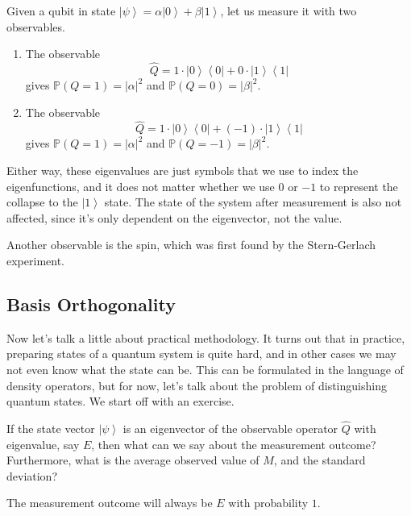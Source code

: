 \documentclass{article}
\newcommand{\ket}[1]{\ensuremath{\left|#1\right\rangle}}
\newcommand{\bra}[1]{\ensuremath{\left\langle#1\right|}}
\begin{document}
    \begin{example}
      \label{ex:position-measurement-of-qubit}
      Given a qubit in state $\ket{\psi} = \alpha \ket{0} + \beta \ket{1}$, let us measure it with two observables. 
      \begin{enumerate} 
        \item The observable 
          \begin{equation} 
            \hat{Q} = 1 \cdot \ket{0}\bra{0} + 0 \cdot \ket{1}\bra{1}
          \end{equation}
          gives $\mathbb{P}(Q = 1) = |\alpha|^2$ and $\mathbb{P}(Q = 0) = |\beta|^2$. 

        \item The observable 
          \begin{equation} 
            \hat{Q} = 1 \cdot \ket{0}\bra{0} + (-1) \cdot \ket{1}\bra{1}
          \end{equation}
          gives $\mathbb{P}(Q = 1) = |\alpha|^2$ and $\mathbb{P}(Q = -1) = |\beta|^2$. 
      \end{enumerate}
      Either way, these eigenvalues are just symbols that we use to index the eigenfunctions, and it does not matter whether we use $0$ or $-1$ to represent the collapse to the $\ket{1}$ state. The state of the system after measurement is also not affected, since it's only dependent on the eigenvector, not the value. 
    \end{example}

    Another observable is the spin, which was first found by the Stern-Gerlach experiment. 

  \subsection{Basis Orthogonality}

    Now let's talk a little about practical methodology. It turns out that in practice, preparing states of a quantum system is quite hard, and in other cases we may not even know what the state can be. This can be formulated in the language of density operators, but for now, let's talk about the problem of distinguishing quantum states.  We start off with an exercise. 

    \begin{exercise}[Neilson 2.58]
      If the state vector $\ket{\psi}$ is an eigenvector of the observable operator $\hat{Q}$ with eigenvalue, say $E$, then what can we say about the measurement outcome? Furthermore, what is the average observed value of $M$, and the standard deviation? 
    \end{exercise}
    \begin{solution} 
      The measurement outcome will always be $E$ with probability $1$. 
    \end{solution}
\end{document}
